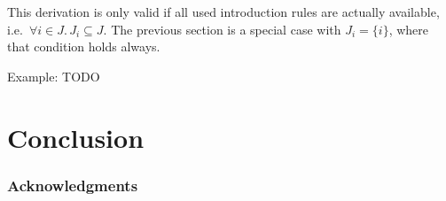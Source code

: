 \documentclass{llncs}
\begin{document}
This derivation is only valid if all used introduction rules are actually available, i.e.\ $\forall i \in J.\, J_i \subseteq J$.  The previous section is a special case with $J_i=\{i\}$, where that condition holds always.


Example: TODO


\section{Conclusion}

\subsubsection*{Acknowledgments}



\end{document}
